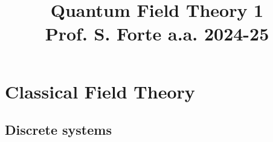 \documentclass[a4paper, 12pt, openany]{book}
\title{\Huge\textbf{Quantum Field Theory 1} \\ \large Prof. S. Forte a.a. 2024-25}
\begin{document}
\frontmatter

\maketitle
\tableofcontents

\mainmatter

\part{Classical Field Theory}
\pagestyle{body}

\chapter{Discrete systems}

\end{document}
